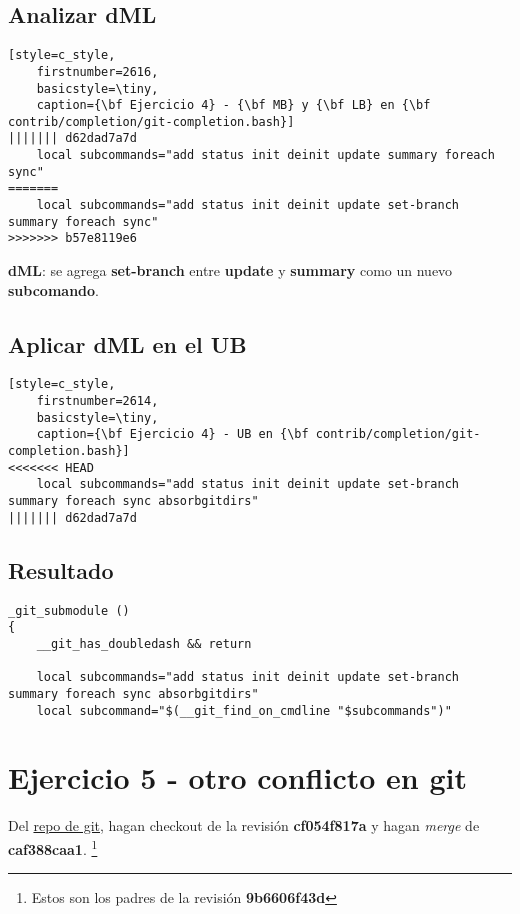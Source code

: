 \subsection*{Analizar {\bf dML}}
\begin{lstlisting}[style=c_style,
	firstnumber=2616,
	basicstyle=\tiny,
	caption={\bf Ejercicio 4} - {\bf MB} y {\bf LB} en {\bf contrib/completion/git-completion.bash}]
||||||| d62dad7a7d
	local subcommands="add status init deinit update summary foreach sync"
=======
	local subcommands="add status init deinit update set-branch summary foreach sync"
>>>>>>> b57e8119e6
\end{lstlisting}

{\bf dML}: se agrega {\bf set-branch} entre {\bf update} y {\bf summary} como un nuevo {\bf subcomando}.

\subsection*{Aplicar {\bf dML} en el {\bf UB}}
\begin{lstlisting}[style=c_style,
	firstnumber=2614,
	basicstyle=\tiny,
	caption={\bf Ejercicio 4} - UB en {\bf contrib/completion/git-completion.bash}]
<<<<<<< HEAD
	local subcommands="add status init deinit update set-branch summary foreach sync absorbgitdirs"
||||||| d62dad7a7d
\end{lstlisting}

\subsection*{Resultado}
\begin{lstlisting}[style=c_style,
	firstnumber=2610,
	basicstyle=\tiny,
	caption={\bf Ejercicio 4} - Resolución de conflicto]
_git_submodule ()
{
	__git_has_doubledash && return

	local subcommands="add status init deinit update set-branch summary foreach sync absorbgitdirs"
	local subcommand="$(__git_find_on_cmdline "$subcommands")"
\end{lstlisting}


\section{Ejercicio 5 - otro conflicto en git}
\label{exercise_05}
Del \hyperref[git_repo]{repo de git}, hagan checkout de la revisión {\bf cf054f817a} y hagan {\it merge} de {\bf caf388caa1}.
\footnote{Estos son los padres de la revisión {\bf 9b6606f43d}}

